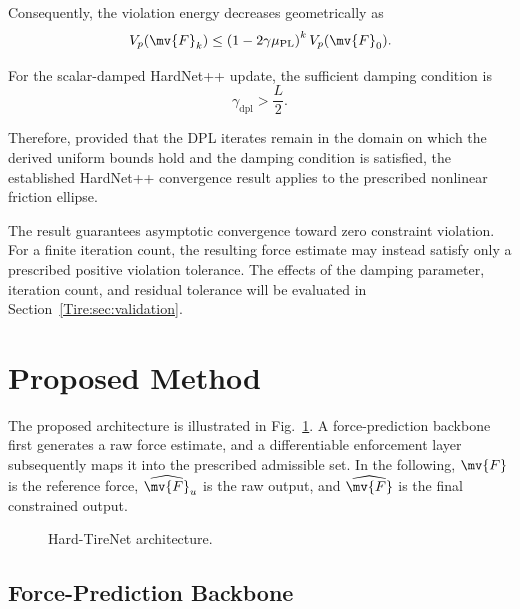 Consequently, the violation energy decreases geometrically as
\begin{equation}
	\label{Tire:eq:dpl:geometric:convergence}
	V_p(\mv{F}_k)
	\leq
	\left(
	1-2\gamma\mu_{\mathrm{PL}}
	\right)^k
	V_p(\mv{F}_0)
	.
\end{equation}

For the scalar-damped HardNet++ update, the sufficient damping condition is
\begin{equation}
	\gamma_{\mathrm{dpl}}
	>
	\frac{L}{2}
	.
\end{equation}

Therefore, provided that the DPL iterates remain in the domain on which the
derived uniform bounds hold and the damping condition is satisfied, the
established HardNet++ convergence result applies to the prescribed nonlinear
friction ellipse.

The result guarantees asymptotic convergence toward zero constraint violation.
For a finite iteration count, the resulting force estimate may instead satisfy
only a prescribed positive violation tolerance. The effects of the damping
parameter, iteration count, and residual tolerance will be evaluated in
Section~\ref{Tire:sec:validation}.

\section{Proposed Method}
\label{Tire:sec:proposedmethod}

The proposed architecture is illustrated in Fig.~\ref{Tire:fig:architecture}. A
force-prediction backbone first generates a raw force estimate, and a
differentiable enforcement layer subsequently maps it into the prescribed
admissible set. In the following, $\mv{F}$ is the reference force,
$\widehat{\mv{F}}_u$ is the raw output, and $\widehat{\mv{F}}$ is the final
constrained output.

\begin{figure}[t]
	\centering
	\resizebox{0.8\textwidth}{!}{%
	}
	\caption{Hard-TireNet architecture.}
	\label{Tire:fig:architecture}
\end{figure}

\subsection{Force-Prediction Backbone}
\label{Tire:sec:backbone}

